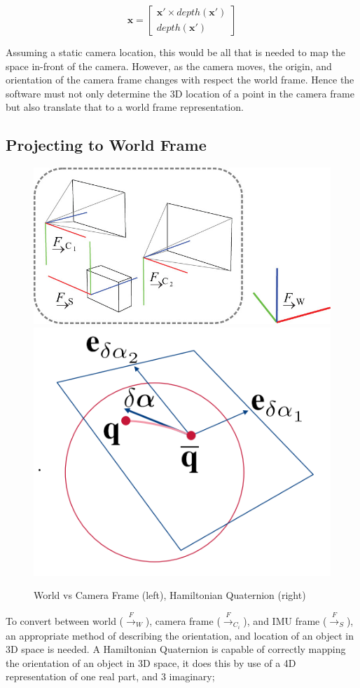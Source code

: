 \documentclass[11pt,twoside]{report}
\begin{document}
\begin{equation}
\mathbf{x} = 
\begin{bmatrix}
\mathbf{x'} \times depth(\mathbf{x'})\\
depth(\mathbf{x'})
\end{bmatrix}
\label{camera_add_depth}
\end{equation}

Assuming a static camera location, this would be all that is needed to map the space in-front of the camera. However, as the camera moves, the origin, and orientation of the camera frame changes with respect the world frame. Hence the software must not only determine the 3D location of a point in the camera frame but also translate that to a world frame representation.

\subsection{Projecting to World Frame}


\noindent \begin{figure}[h!]
	\includegraphics[width = 0.5\hsize]{figures/world_to_cam.jpg}
	\includegraphics[width = 0.35\hsize]{figures/quaternions.png}
	\caption{World vs Camera Frame (left)\cite{Okvis_1}, Hamiltonian Quaternion (right)}
	\label{quat_wcs}
\end{figure}


To convert between world (${\xrightarrow{F}}_{W}$), camera frame (${\xrightarrow{F}}_{C_{i}}$), and IMU frame (${\xrightarrow{F}}_{S}$), an appropriate method of describing the orientation, and location of an object in 3D space is needed. A Hamiltonian Quaternion is capable of correctly mapping the orientation of an object in 3D space, it does this by use of a 4D representation of one real part, and 3 imaginary;  
\end{document}
